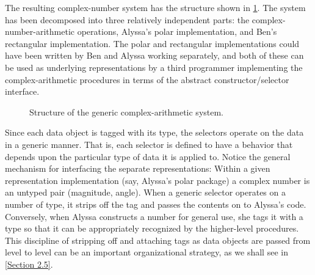 The resulting complex-number system has the structure shown in \cref{Figure 2.21}.
The system has been decomposed into three relatively independent parts:
the complex-number-arithmetic operations, Alyssa’s polar implementation, and Ben’s rectangular implementation.
The polar and rectangular implementations could have been written by Ben and Alyssa working separately, and both of these can be used as underlying representations by a third programmer implementing the complex-arithmetic procedures in terms of the abstract constructor/selector interface.

\begin{figure}[tb]
	\centering
	
	\caption{
		Structure of the generic complex-arithmetic system.
	}
	\label{Figure 2.21}
\end{figure}

Since each data object is tagged with its type, the selectors operate on the data in a generic manner.
That is, each selector is defined to have a behavior that depends upon the particular type of data it is applied to.
Notice the general mechanism for interfacing the separate representations:
Within a given representation implementation (say, Alyssa’s polar package) a complex number is an untyped pair (magnitude, angle).
When a generic selector operates on a number of  type, it strips off the tag and passes the contents on to Alyssa’s code.
Conversely, when Alyssa constructs a number for general use, she tags it with a type so that it can be appropriately recognized by the higher-level procedures.
This discipline of stripping off and attaching tags as data objects are passed from level to level can be an important organizational strategy, as we shall see in \cref{Section 2.5}.
